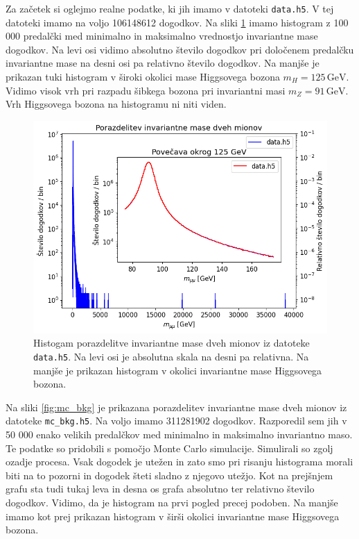 \documentclass[slovene,11pt,a4paper]{article}
\begin{document}
Za začetek si oglejmo realne podatke, ki jih imamo v datoteki \texttt{data.h5}. V tej datoteki imamo na voljo 106148612 dogodkov. Na sliki \ref{fig:data} imamo histogram z 100 000 predalčki med minimalno in maksimalno vrednostjo invariantne mase dogodkov. Na levi osi vidimo absolutno število dogodkov pri določenem predalčku invariantne mase na desni osi pa relativno število dogodkov. Na manjše je prikazan tuki histogram v široki okolici mase Higgsovega bozona $m_H = 125 \, \text{GeV}$. Vidimo visok vrh pri razpadu šibkega bozona pri invariantni masi $m_Z = 91 \, \text{GeV}$. Vrh Higgsovega bozona na histogramu ni niti viden.

\begin{figure}[h!]
    \centering
    \includegraphics[width=0.8\linewidth]{imgs/data.png}
    \caption{Histogam porazdelitve invariantne mase dveh mionov iz datoteke \texttt{data.h5}.
    Na levi osi je absolutna skala na desni pa relativna. Na manjše je prikazan histogram v okolici
    invariantne mase Higgsovega bozona.}
    \label{fig:data}
\end{figure}

Na sliki \ref{fig:mc_bkg} je prikazana porazdelitev invariantne mase dveh mionov iz datoteke \texttt{mc\_bkg.h5}. Na voljo imamo 311281902 dogodkov. Razporedil sem jih v 50 000 enako velikih predalčkov med minimalno in maksimalno invariantno maso. Te podatke so pridobili s pomočjo Monte Carlo simulacije. Simulirali so zgolj ozadje procesa. Vsak dogodek je utežen in zato smo pri risanju histograma morali biti na to pozorni in dogodek šteti sladno z njegovo utežjo. Kot na prejšnjem grafu sta tudi tukaj leva in desna os grafa absolutno ter relativno število dogodkov. Vidimo, da je histogram na prvi pogled precej podoben. Na manjše imamo kot prej prikazan histogram v širši okolici invariantne mase Higgsovega bozona.
\end{document}
